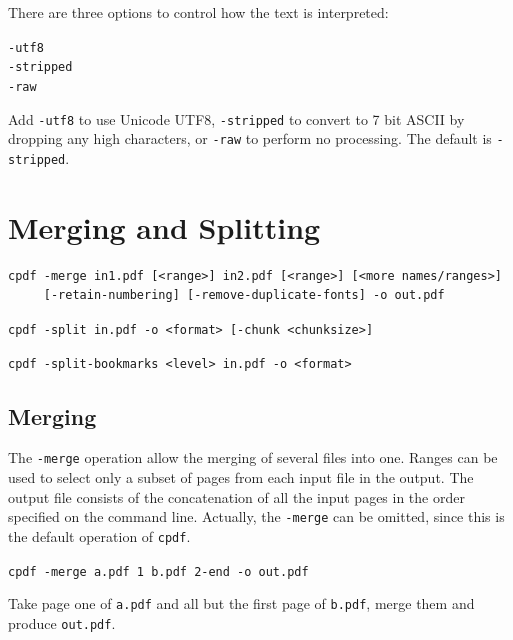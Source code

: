 \documentclass[a4paper,makeidx]{memoir}
\newcommand{\cpdf}{\texttt{cpdf}}
\begin{document}
\noindent There are three options to control how the text is interpreted:

\begin{framed}
  \noindent\small\verb!-utf8!\\
  \noindent\small\verb!-stripped!\\
  \noindent\small\verb!-raw!
\end{framed}

\noindent Add \verb!-utf8! to use Unicode UTF8, \verb!-stripped! to convert to 7
bit ASCII by dropping any high characters, or \verb!-raw! to perform no
processing. The default is \verb!-stripped!.

\chapter{Merging and Splitting}
  \begin{framed}
  \small
  \noindent\begin{verbatim}
cpdf -merge in1.pdf [<range>] in2.pdf [<range>] [<more names/ranges>]
     [-retain-numbering] [-remove-duplicate-fonts] -o out.pdf\end{verbatim}

  \vspace{1.5mm}
  \noindent\verb!cpdf -split in.pdf -o <format> [-chunk <chunksize>]!

  \vspace{1.5mm}
  \noindent\verb!cpdf -split-bookmarks <level> in.pdf -o <format>!
  \end{framed}

  \vspace{12mm}
  \section{Merging}
  The \texttt{-merge} operation allow the merging of several files into one.
Ranges can be used to select only a subset of pages from each
input file in the output. The output file consists of the concatenation of all
the input pages in the order specified on the command line. Actually, the
\texttt{-merge} can be omitted, since this is the default operation of \cpdf.

  \begin{framed}\small
    \verb!cpdf -merge a.pdf 1 b.pdf 2-end -o out.pdf!

    \vspace{2.5mm}
    \noindent Take page one of \texttt{a.pdf} and all but the first page of
\texttt{b.pdf}, merge them and produce \texttt{out.pdf}.
  \end{framed}
\end{document}
